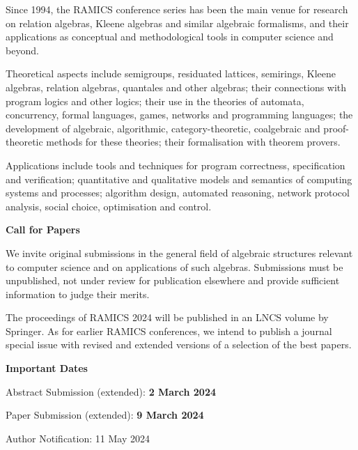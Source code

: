 \documentclass[a3paper, 12pt]{article}
\newcommand*\nfont{\fontsize{16}{19}\selectfont}
\begin{document}
\begin{minipage}[t]{.473\linewidth}
  \nfont%
  Since 1994, the RAMICS conference series has been the main venue for
  research on relation algebras, Kleene algebras and similar algebraic
  formalisms, and their applications as conceptual and methodological
  tools in computer science and beyond.

  \medskip

  Theoretical aspects include semigroups, residuated lattices,
  semirings, Kleene algebras, relation algebras, quantales and other
  algebras; their connections with program logics and other logics;
  their use in the theories of automata, concurrency, formal
  languages, games, networks and programming languages; the
  development of algebraic, algorithmic, category-theoretic,
  coalgebraic and proof-theoretic methods for these theories; their
  formalisation with theorem provers.

  \medskip

  Applications include tools and techniques for program correctness,
  specification and verification; quantitative and qualitative models
  and semantics of computing systems and processes; algorithm design,
  automated reasoning, network protocol analysis, social choice,
  optimisation and control.

  \bigskip

  {\Large \bf Call for Papers}

  \smallskip

  We invite original submissions in the general field of algebraic
  structures relevant to computer science and on applications of such
  algebras.  Submissions must be unpublished, not under review for
  publication elsewhere and provide sufficient information to judge
  their merits.

  The proceedings of RAMICS 2024 will be published in an LNCS volume
  by Springer.  As for earlier RAMICS conferences, we intend to
  publish a journal special issue with revised and extended versions
  of a selection of the best papers.
  
  \bigskip
  
  {\Large \bf Important Dates}

  \smallskip

  Abstract Submission (extended): \textbf{2 March 2024}
  
  Paper Submission (extended): \textbf{9 March 2024}
  
  Author Notification: 11 May 2024

\end{minipage}
\end{document}
